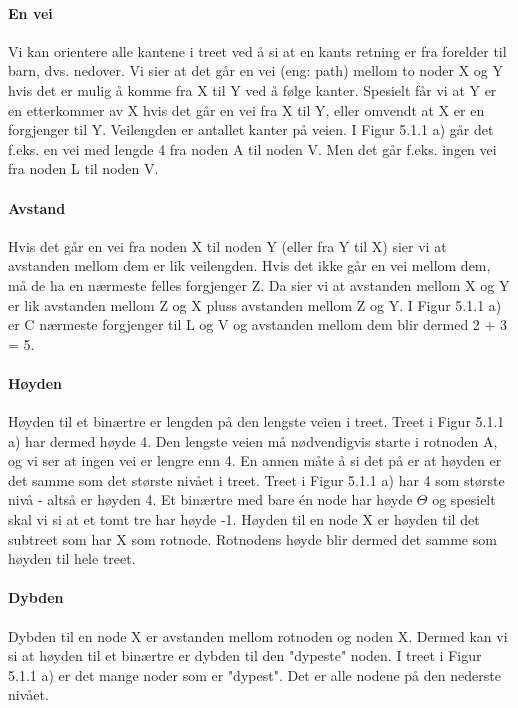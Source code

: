 \documentclass[11pt]{article}
\begin{document}
            \paragraph{En vei}
            Vi kan orientere alle kantene i treet ved å si at en
            kants retning er fra forelder til barn, dvs. nedover. Vi sier at det går en vei (eng: path)
            mellom to noder X og Y hvis det er mulig å komme fra X til Y ved å følge kanter. Spesielt får
            vi at Y er en etterkommer av X hvis det går en vei fra X til Y, eller omvendt at X er en
            forgjenger til Y. Veilengden er antallet kanter på veien. I Figur 5.1.1 a) går det f.eks. en vei
            med lengde 4 fra noden A til noden V. Men det går f.eks. ingen vei fra noden L til noden V.

            \paragraph{Avstand}
            Hvis det går en vei fra noden X til noden Y (eller fra Y til X) sier vi at avstanden
            mellom dem er lik veilengden. Hvis det ikke går en vei mellom dem, må de ha en nærmeste
            felles forgjenger Z. Da sier vi at avstanden mellom X og Y er lik avstanden mellom Z og X
            pluss avstanden mellom Z og Y. I Figur 5.1.1 a) er C nærmeste forgjenger til L og V og
            avstanden mellom dem blir dermed 2 + 3 = 5.

            \paragraph{Høyden}
            Høyden til et binærtre er lengden på den lengste veien i treet. Treet i Figur 5.1.1 a) har
            dermed høyde 4. Den lengste veien må nødvendigvis starte i rotnoden A, og vi ser at ingen
            vei er lengre enn 4. En annen måte å si det på er at høyden er det samme som det største
            nivået i treet. Treet i Figur 5.1.1 a) har 4 som største nivå - altså er høyden 4. Et binærtre
            med bare én node har høyde $\Theta$ og spesielt skal vi si at et tomt tre har høyde -1.
            Høyden til en node X er høyden til det subtreet som har X som rotnode. Rotnodens høyde blir
            dermed det samme som høyden til hele treet.

            \paragraph{Dybden}
            Dybden til en node X er avstanden mellom rotnoden og noden X. Dermed kan vi si at høyden
            til et binærtre er dybden til den "dypeste" noden. I treet i Figur 5.1.1 a) er det mange noder
            som er "dypest". Det er alle nodene på den nederste nivået.
\end{document}
